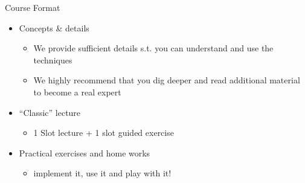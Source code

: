 \documentclass[aspectratio=169]{../latex_main/tntbeamer}  %
\begin{document}
\begin{frame}[c]{Course Format}

\begin{itemize}
	\item Concepts \& details
	\begin{itemize}
	  \item We provide sufficient details s.t. you can understand and use the techniques
	  \item We highly recommend that you dig deeper and read additional material to become a real expert
	\end{itemize}
	\smallskip
	\item ``Classic'' lecture
	\begin{itemize}
	  \item 1 Slot lecture + 1 slot guided exercise
	\end{itemize}
	\smallskip
	\item Practical exercises and home works
	\begin{itemize}
	  \item implement it, use it and play with it!
	\end{itemize}
\end{itemize}

\end{frame}
\end{document}
